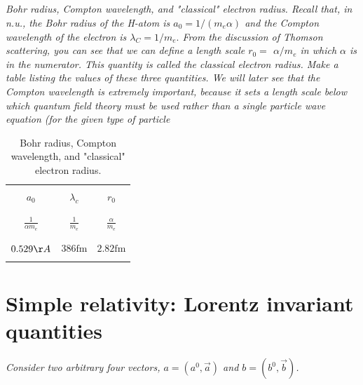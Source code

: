 \documentclass{article}
\begin{document}
\subsection{}
\textit{Bohr radius, Compton wavelength, and "classical" electron radius. Recall that, in n.u., the Bohr radius of the H-atom is $a_{0}=1 /\left(m_{e} \alpha\right)$ and the Compton wavelength of the electron is $\lambda_{C}=1 / m_{e} .$ From the discussion of Thomson scattering, you can see that we can define a length scale $r_{0}=$ $\alpha / m_{e}$ in which $\alpha$ is in the numerator. This quantity is called the classical electron radius. Make a table listing the values of these three quantities. We will later see that the Compton wavelength is extremely important, because it sets a length scale below which quantum field theory must be used rather than a single particle wave equation (for the given type of particle}

\begin{table}[]
    \centering
    \begin{tabular}{||c|c|c||}
        \hline\hline
         &  &\\
        $a_{0}$ & $\lambda_{c}$ & $r_{0}$ \\
         & & \\
        \hline & & \\$\frac{1}{\alpha m_{e}}$ & $\frac{1}{m_{e}}$ & $\frac{\alpha}{m_{e}}$ \\
         & & \\
        \hline & & \\ $0.529 \AA$ & $386 \mathrm{fm}$ & $2.82 \mathrm{fm}$ \\
         & & \\
        \hline\hline
    \end{tabular}
    \caption{Bohr radius, Compton wavelength, and "classical" electron radius.}
    \label{tab:my_label}
\end{table}




\newpage


\section{Simple relativity: Lorentz invariant quantities}
\textit{Consider two arbitrary four vectors, $a=\left(a^{0}, \vec{a}\right)$ and $b=\left(b^{0}, \vec{b}\right)$.}
\end{document}
